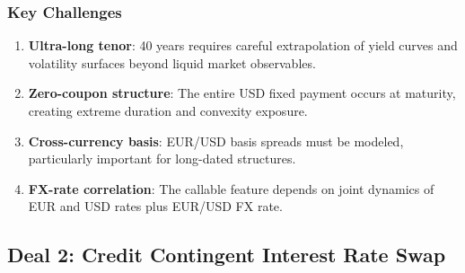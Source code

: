 \documentclass[11pt,a4paper]{article}
\theoremstyle{definition}
\begin{document}
\subsubsection{Key Challenges}

\begin{enumerate}
    \item \textbf{Ultra-long tenor}: 40 years requires careful extrapolation of yield curves and volatility surfaces beyond liquid market observables.

    \item \textbf{Zero-coupon structure}: The entire USD fixed payment occurs at maturity, creating extreme duration and convexity exposure.

    \item \textbf{Cross-currency basis}: EUR/USD basis spreads must be modeled, particularly important for long-dated structures.

    \item \textbf{FX-rate correlation}: The callable feature depends on joint dynamics of EUR and USD rates plus EUR/USD FX rate.
\end{enumerate}

\subsection{Deal 2: Credit Contingent Interest Rate Swap}
\end{document}
